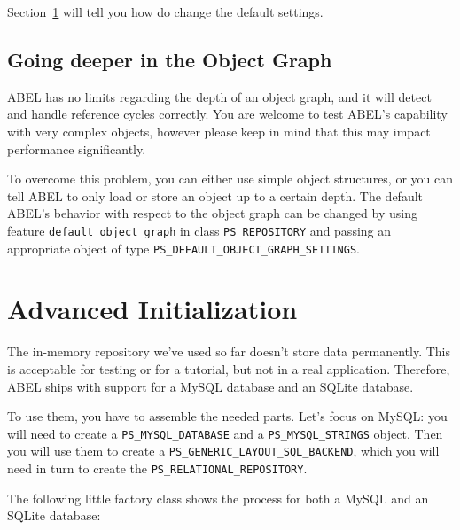\documentclass[a4paper,12pt]{report}
\begin{document}
Section~\ref{sec:going_deeper_in_object_graph} will tell you how do change the default settings.
 
\section{Going deeper in the Object Graph}
\label{sec:going_deeper_in_object_graph}
ABEL has no limits regarding the depth of an object graph, and it will detect and handle reference cycles correctly. 
You are welcome to test ABEL's capability with very complex objects, however please keep in mind that this may impact performance significantly.

To overcome this problem, you can either use simple object structures, or you can tell ABEL to only load or store an object up to a certain depth.
The default ABEL's behavior with respect to the object graph can be changed by using feature \lstinline{default_object_graph} in class \lstinline{PS_REPOSITORY} and passing an appropriate object of type \lstinline{PS_DEFAULT_OBJECT_GRAPH_SETTINGS}.

\chapter{Advanced Initialization}
\label{chapter:advanced_initialization}

The in-memory repository we've used so far doesn't store data permanently.
This is acceptable for testing or for a tutorial, but not in a real application.
Therefore, ABEL ships with support for a MySQL database and an SQLite database.

To use them, you have to assemble the needed parts. Let's focus on MySQL: you will need to create a \lstinline!PS_MYSQL_DATABASE! and a \lstinline!PS_MYSQL_STRINGS! object.
Then you will use them to create a \lstinline!PS_GENERIC_LAYOUT_SQL_BACKEND!, which you will need in turn to create the \lstinline!PS_RELATIONAL_REPOSITORY!.

The following little factory class shows the process for both a MySQL and an SQLite database:
\end{document}
